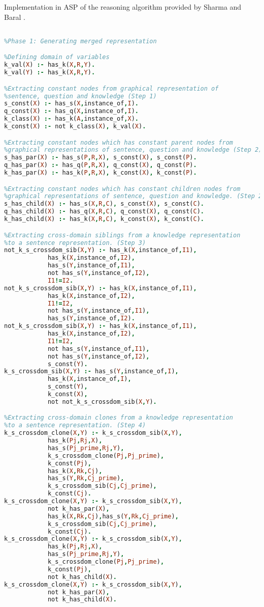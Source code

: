 \label{AppendixA}

Implementation in ASP of the reasoning algorithm provided by Sharma and Baral \cite{2018CommonsenseKT}.
\begin{lstlisting}[language=Prolog]

%Phase 1: Generating merged representation

%Defining domain of variables
k_val(X) :- has_k(X,R,Y).
k_val(Y) :- has_k(X,R,Y).

%Extracting constant nodes from graphical representation of  
%sentence, question and knowledge (Step 1)
s_const(X) :- has_s(X,instance_of,I).
q_const(X) :- has_q(X,instance_of,I).
k_class(X) :- has_k(A,instance_of,X).
k_const(X) :- not k_class(X), k_val(X).

%Extracting constant nodes which has constant parent nodes from
%graphical representations of sentence, question and knowledge (Step 2)
s_has_par(X) :- has_s(P,R,X), s_const(X), s_const(P).
q_has_par(X) :- has_q(P,R,X), q_const(X), q_const(P).
k_has_par(X) :- has_k(P,R,X), k_const(X), k_const(P).

%Extracting constant nodes which has constant children nodes from
%graphical representations of sentence, question and knowledge. (Step 2)
s_has_child(X) :- has_s(X,R,C), s_const(X), s_const(C).
q_has_child(X) :- has_q(X,R,C), q_const(X), q_const(C).
k_has_child(X) :- has_k(X,R,C), k_const(X), k_const(C).

%Extracting cross-domain siblings from a knowledge representation  
%to a sentence representation. (Step 3)
not_k_s_crossdom_sib(X,Y) :- has_k(X,instance_of,I1),
			has_k(X,instance_of,I2),
			has_s(Y,instance_of,I1),
			not has_s(Y,instance_of,I2),
			I1!=I2.
not_k_s_crossdom_sib(X,Y) :- has_k(X,instance_of,I1),  
			has_k(X,instance_of,I2),
			I1!=I2,
			not has_s(Y,instance_of,I1),
			has_s(Y,instance_of,I2).
not_k_s_crossdom_sib(X,Y) :- has_k(X,instance_of,I1),
			has_k(X,instance_of,I2),
			I1!=I2,
			not has_s(Y,instance_of,I1),
			not has_s(Y,instance_of,I2),
			s_const(Y).
k_s_crossdom_sib(X,Y) :- has_s(Y,instance_of,I),
			has_k(X,instance_of,I),
			s_const(Y),
			k_const(X),
			not not_k_s_crossdom_sib(X,Y).

%Extracting cross-domain clones from a knowledge representation  
%to a sentence representation. (Step 4)
k_s_crossdom_clone(X,Y) :- k_s_crossdom_sib(X,Y),
			has_k(Pj,Rj,X),
			has_s(Pj_prime,Rj,Y),
			k_s_crossdom_clone(Pj,Pj_prime),
			k_const(Pj),
			has_k(X,Rk,Cj),
			has_s(Y,Rk,Cj_prime),
			k_s_crossdom_sib(Cj,Cj_prime),
			k_const(Cj).
k_s_crossdom_clone(X,Y) :- k_s_crossdom_sib(X,Y),
			not k_has_par(X),
			has_k(X,Rk,Cj),has_s(Y,Rk,Cj_prime),
			k_s_crossdom_sib(Cj,Cj_prime),
			k_const(Cj).
k_s_crossdom_clone(X,Y) :- k_s_crossdom_sib(X,Y),
			has_k(Pj,Rj,X),
			has_s(Pj_prime,Rj,Y),
			k_s_crossdom_clone(Pj,Pj_prime),
			k_const(Pj),
			not k_has_child(X).
k_s_crossdom_clone(X,Y) :- k_s_crossdom_sib(X,Y),
			not k_has_par(X),
			not k_has_child(X).


\end{lstlisting}
